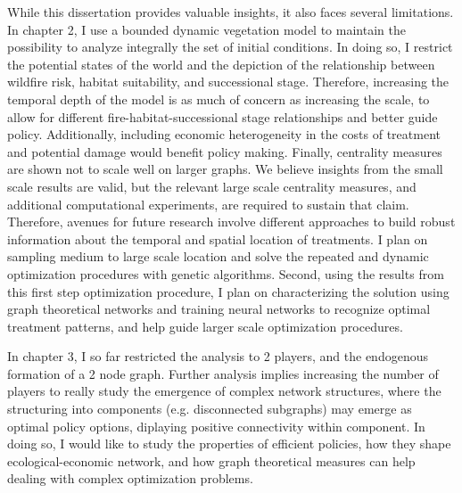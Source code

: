 While this dissertation provides valuable insights, it also faces several limitations.\\
In chapter 2, I use a bounded dynamic vegetation model to maintain the possibility to analyze integrally the set of initial conditions. In doing so, I restrict the potential states of the world and the depiction of the relationship between wildfire risk, habitat suitability, and successional stage. Therefore, increasing the temporal depth of the model is as much of concern as increasing the scale, to allow for different fire-habitat-successional stage relationships and better guide policy.
Additionally, including economic heterogeneity in the costs of treatment and potential damage would benefit policy making. Finally, centrality measures are shown  not to scale well on larger graphs. We believe insights from the small scale results are valid, but the relevant large scale centrality measures, and additional computational experiments, are required to sustain that claim. Therefore, avenues for future research involve different approaches to build robust information about the temporal and spatial location of treatments.  I plan on sampling medium to large scale location and solve the repeated and dynamic optimization procedures with genetic algorithms. Second, using the results from this first step optimization procedure, I plan on characterizing the solution using graph theoretical networks and training neural networks to recognize optimal treatment patterns, and help guide larger scale optimization procedures. 

In chapter 3, I so far restricted the analysis to 2 players, and the endogenous formation of a 2 node graph. Further analysis implies increasing the number of players to really study the emergence of complex network structures, where the structuring into components (e.g. disconnected subgraphs) may emerge as optimal policy options, diplaying positive connectivity within component. In doing so, I would like to study the properties of efficient policies, how they shape ecological-economic network, and how graph theoretical measures can help dealing with complex optimization problems. 

